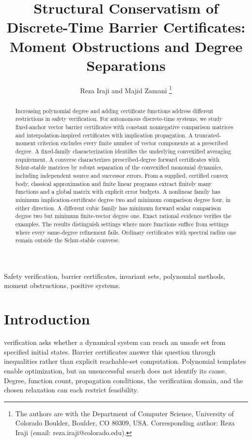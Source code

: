 \documentclass[journal,10pt]{IEEEtran}
\title{Structural Conservatism of Discrete-Time Barrier Certificates:
Moment Obstructions and Degree Separations}
\author{Reza Iraji and Majid Zamani%
\thanks{The authors are with the Department of Computer Science, University of Colorado Boulder, Boulder, CO 80309, USA. Corresponding author: Reza Iraji (email: reza.iraji@colorado.edu).}}
\theoremstyle{definition}\newtheorem{definition}{Definition}
\theoremstyle{remark}
\begin{document}
\maketitle
\begin{abstract}
Increasing polynomial degree and adding certificate functions address different restrictions in safety verification. For autonomous discrete-time systems, we study fixed-anchor vector barrier certificates with constant nonnegative comparison matrices and interpolation-inspired certificates with implication propagation. A truncated-moment criterion excludes every finite number of vector components at a prescribed degree. A fixed-family characterization identifies the underlying convexified averaging requirement. A converse characterizes prescribed-degree forward certificates with Schur-stable matrices by robust separation of the convexified monomial dynamics, including independent source and successor errors. From a supplied, certified convex body, classical approximation and finite linear programs extract finitely many functions and a global matrix with explicit error budgets. A nonlinear family has minimum implication-certificate degree two and minimum comparison degree four, in either direction. A different cubic family has minimum forward scalar comparison degree two but minimum finite-vector degree one. Exact rational evidence verifies the examples. The results distinguish settings where more functions suffice from settings where every same-degree refinement fails. Ordinary certificates with spectral radius one remain outside the Schur-stable converse.
\end{abstract}
\begin{IEEEkeywords}
Safety verification, barrier certificates, invariant sets, polynomial methods, moment obstructions, positive systems.
\end{IEEEkeywords}

\section{Introduction}
 verification asks whether a dynamical system can reach an unsafe set from specified initial states. Barrier certificates answer this question through inequalities rather than explicit reachable-set computation. Polynomial templates enable optimization, but an unsuccessful search does not identify its cause. Degree, function count, propagation conditions, the verification domain, and the chosen relaxation can each restrict feasibility.
\end{document}
